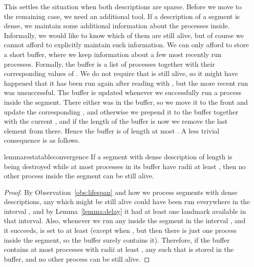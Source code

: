\documentclass{article}[11pt,letter]
\begin{document}
This settles the situation when both descriptions are sparse. Before we move to the remaining case, we need an additional tool. If a
description of a segment is dense, we maintain some additional information about the processes inside. Informally, we would like to know which
of them are still alive, but of course we cannot afford to explicitly maintain such information. We can only afford to store a short buffer, 
where we keep information about a few most recently run processes. Formally, the buffer is a list of processes  together with their
corresponding values of . We do not require that  is still alive, so it might have happened that it has been run again after reading 
with , but the more recent run was unsuccessful. The buffer is updated whenever we successfully run a process  inside the segment.
There either  was in the buffer, so we move it to the front and update the corresponding , and otherwise
we prepend it to the buffer together with the current , and if the length of the buffer is now  we remove the last element from there.
 Hence the buffer is of length at most . A less trivial consequence is as follows.

\begin{restatable}{lemma}{restatableconvergence}
\label{lemma:convergence}
If a segment with dense description of length  is being destroyed while at most  processes in its buffer have radii at least , 
then no other process inside the segment can be still alive.
\end{restatable}

\begin{proof}
By Observation~\ref{obs:lifespan} and how we process segments with dense descriptions, any  which might be still alive could have been run everywhere
in the interval , and by Lemma~\ref{lemma:delay} it had at least one
landmark available in that interval. Also, whenever we run any  inside the segment in the interval , and 
it succeeds,  is set to at least  (except when , but then there is just one process inside the segment, so the buffer
surely contains it). Therefore, if the buffer contains at most  processes with radii at least , any  such that 
is stored in the buffer, and no other process can be still alive.
\end{proof}
\end{document}
